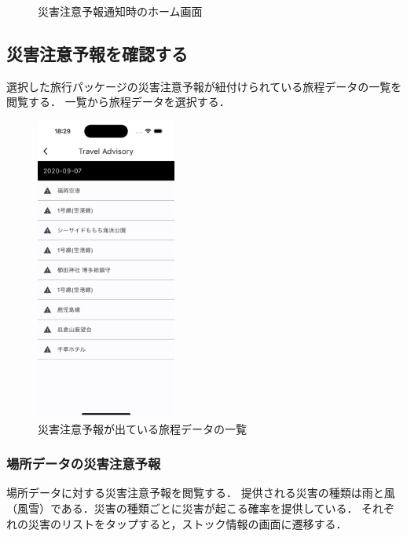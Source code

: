 \begin{figure}[H]
\begin{minipage}[b]{0.45\linewidth}
    \caption{災害注意予報通知時のホーム画面}
    \label{fig:unormal_home_screen}
  \end{minipage}
\end{figure}

\subsection {災害注意予報を確認する}
選択した旅行パッケージの災害注意予報が紐付けられている旅程データの一覧を閲覧する．
一覧から旅程データを選択する．
\begin{figure}[H]
  \centering
  \includegraphics[height=10cm]{./fig/advisory_data_list.png}
  \caption{災害注意予報が出ている旅程データの一覧}
  \label{fig:advisory_data_list}
\end{figure}

\subsubsection {場所データの災害注意予報}
場所データに対する災害注意予報を閲覧する．
提供される災害の種類は雨と風（風雪）である．災害の種類ごとに災害が起こる確率を提供している．
それぞれの災害のリストをタップすると，ストック情報の画面に遷移する．

